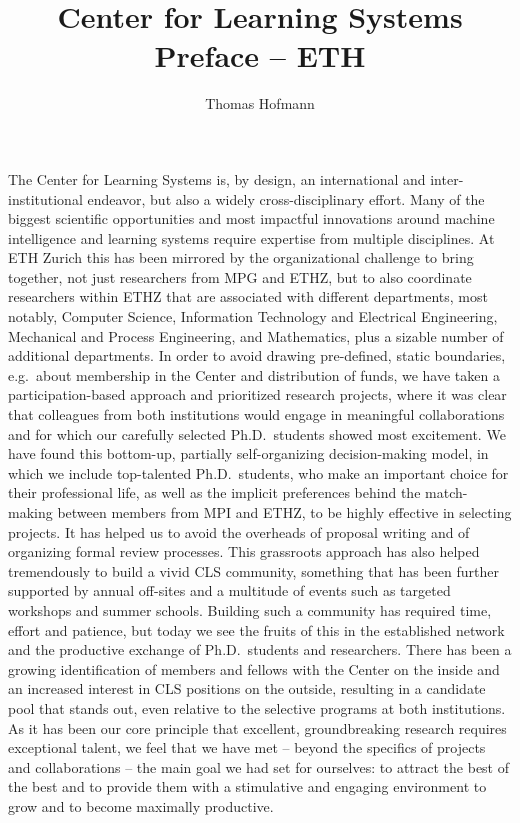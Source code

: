 \documentclass{article}
\author{Thomas Hofmann}
\title{Center for Learning Systems \\ Preface -- ETH}
\begin{document}
\maketitle

The Center for Learning Systems is, by design, an international and inter-institutional endeavor,  but also a widely cross-disciplinary effort. Many of the biggest scientific opportunities and most impactful innovations around machine intelligence and learning systems require expertise from multiple disciplines. At ETH Zurich this has been mirrored by the organizational challenge to bring together, not just researchers from MPG and ETHZ, but to also coordinate researchers within ETHZ that are associated with different departments, most notably, Computer Science, Information Technology and Electrical Engineering, Mechanical and Process Engineering, and Mathematics, plus a sizable number of additional departments. In order to avoid drawing pre-defined, static boundaries, e.g.~about membership in the Center and distribution of funds, we have taken a participation-based approach and prioritized research projects, where it was clear that colleagues from both institutions would engage in meaningful collaborations and for which our carefully selected Ph.D.~students showed most excitement. We have found this bottom-up, partially self-organizing decision-making model, in which we include top-talented Ph.D.~students, who make an important choice for their professional life, as well as the implicit preferences  behind the match-making between members from MPI and ETHZ, to be highly effective in selecting projects. It has helped us to avoid the overheads of proposal writing and of organizing formal review processes. This grassroots approach has also helped tremendously to build a vivid CLS community, something that has been further supported by annual off-sites and a multitude of events such as targeted workshops and summer schools. Building such a community has required time, effort and patience, but today we see the fruits of this in the established network and the productive exchange of Ph.D.~students and researchers. There has been a growing identification of members and fellows with the Center on the inside and an increased interest in CLS positions on the outside, resulting in a candidate pool that stands out, even relative to the selective programs at both institutions. As it has been our core principle that excellent, groundbreaking research requires exceptional talent, we feel that we have met -- beyond the specifics of projects and collaborations -- the main goal we had set for ourselves: to attract the best of the best and to provide them with a stimulative and engaging environment to grow and to become maximally productive.  
\end{document}
